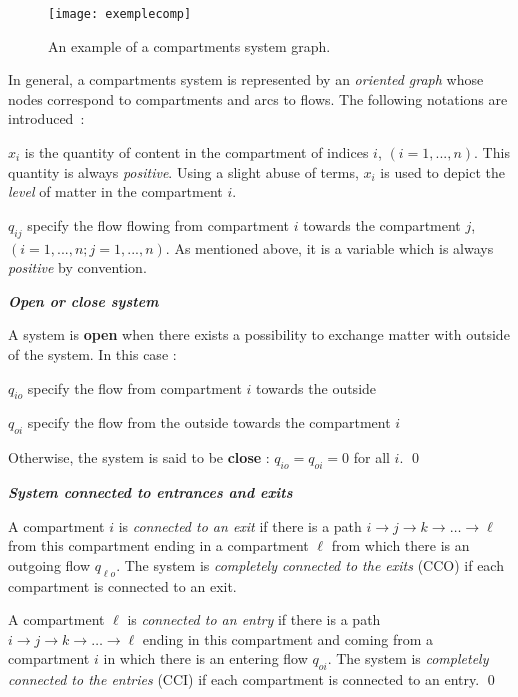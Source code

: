 \begin{figure}[ht]
\begin{center}
\texttt{[image: exemplecomp]}
\caption{An example of a compartments system graph.}
\label{fig:exemplecomp}
\end{center} 
\end{figure}

In general, a compartments system is represented by an {\em oriented graph} 
whose nodes correspond to compartments and arcs to flows. 
The following notations are introduced~:
\begin{description}
\item $x_i$ is the quantity of content in the compartment of indices $i$,
$(i = 1, ... ,n)$. This quantity is always {\em positive}. Using a slight abuse of terms,
$x_i$ is used to depict the {\em level} of matter in the compartment $i$.
\item $q_{ij}$ specify the flow flowing from compartment $i$ towards the  
compartment $j$, $(i = 1, ... ,n ; j = 1, ... ,n)$. As mentioned above, it is a
variable which is always {\em positive} by convention.
\end{description}

\begin{definition}{\bf \em Open or close system}

A system is {\bf open} when there exists a possibility to exchange matter
with outside of the system.
In this case :  
\begin{description}
\item $q_{io}$ specify the flow from  compartment $i$ towards the outside
\item $q_{oi}$ specify the flow from the outside towards the compartment $i$
\end{description}
Otherwise, the system is said to be {\bf close} : $q_{io} = 
q_{oi} = 0$ for all $i$. \qed
\end{definition}

\begin{definition}{\bf \em System connected to entrances and exits}

A compartment $i$ is {\it connected to an exit} if there is a path $i \rightarrow j \rightarrow k \rightarrow \dots \rightarrow \ell$ from this compartment ending in a compartment $\ell$ from which there is an outgoing flow  $q_{\ell o}$. The system is {\it completely connected to the exits} (CCO) if each compartment is connected to an exit.

A compartment $\ell$ is {\it connected to an entry} if there is a path $i \rightarrow j \rightarrow k \rightarrow \dots \rightarrow \ell$ ending in this compartment and coming from a compartment $i$ in which there is an entering flow $q_{oi}$. The system is {\it completely connected to the entries} (CCI) if each compartment is connected to an entry. \qed 
\end{definition}


